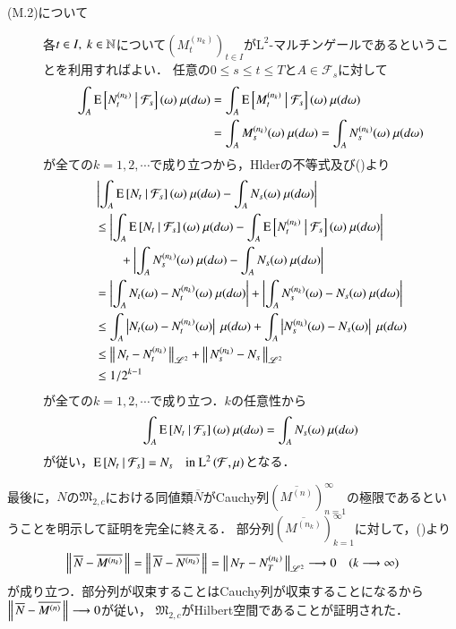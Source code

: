 \begin{prf}
\begin{description}
			\item[(M.2)について]
				各$t \in I,\ k \in \mathbb{N}$について$(M^{(n_k)}_t)_{t \in I}$が$\mathrm{L}^2$-マルチンゲールであるということを利用すればよい．
				任意の$0 \leq s \leq t \leq T$と$A \in \mathcal{F}_s$に対して
				\begin{align}
					\int_{A} \cexp{N^{(n_k)}_t}{\mathcal{F}_s}(\omega)\ \mu(d\omega) &= \int_{A} \cexp{M^{(n_k)}_t}{\mathcal{F}_s}(\omega)\ \mu(d\omega) \\
					&= \int_{A} M^{(n_k)}_s(\omega)\ \mu(d\omega) = \int_{A} N^{(n_k)}_s(\omega)\ \mu(d\omega)
				\end{align}
				が全ての$k = 1,2,\cdots$で成り立つから，Hlderの不等式及び()より
				\begin{align}
					&\left| \int_{A} \cexp{N_t}{\mathcal{F}_s}(\omega)\ \mu(d\omega) - \int_{A} N_s(\omega)\ \mu(d\omega) \right| \\
					&\leq \left| \int_{A} \cexp{N_t}{\mathcal{F}_s}(\omega)\ \mu(d\omega) - \int_{A} \cexp{N^{(n_k)}_t}{\mathcal{F}_s}(\omega)\ \mu(d\omega) \right| \\
						&\qquad+ \left| \int_{A} N^{(n_k)}_s(\omega)\ \mu(d\omega) - \int_{A} N_s(\omega)\ \mu(d\omega) \right| \\
					&= \left| \int_{A} N_t(\omega) - N^{(n_k)}_t(\omega)\ \mu(d\omega) \right|
						+ \left| \int_{A} N^{(n_k)}_s(\omega) - N_s(\omega)\ \mu(d\omega) \right| \\
					&\leq \int_{A} \left| N_t(\omega) - N^{(n_k)}_t(\omega) \right|\ \mu(d\omega)
						+ \int_{A} \left| N^{(n_k)}_s(\omega) - N_s(\omega) \right|\ \mu(d\omega) \\
					&\leq \Norm{N_t - N^{(n_k)}_t}{\mathscr{L}^2} + \Norm{N^{(n_k)}_s - N_s}{\mathscr{L}^2} \\
					&\leq 1/2^{k-1}
				\end{align}
				が全ての$k = 1,2,\cdots$で成り立つ．$k$の任意性から
				\begin{align}
					\int_{A} \cexp{N_t}{\mathcal{F}_s}(\omega)\ \mu(d\omega)
					= \int_{A} N_s(\omega)\ \mu(d\omega)
				\end{align}
				が従い，$\operatorname{E} \left[ N_t \ \middle|\ \mathcal{F}_s \right] = N_s \quad \mbox{in $\operatorname{L}^{2} \left(\mathcal{F},\mu\right)$}$となる．
		\end{description}
	
		最後に，$N$の$\mathfrak{M}_{2,c}$における同値類$\overline{N}$がCauchy列$\left(\overline{M^{(n)}}\right)_{n=1}^{\infty}$の極限であるということを明示して証明を完全に終える．
		部分列$\left(\overline{M^{(n_k)}}\right)_{k=1}^{\infty}$に対して，()より
		\begin{align}
				\left\|\, \overline{N} - \overline{M^{(n_k)}}\, \right\|_{} 
				= \left\|\, \overline{N} - \overline{N^{(n_k)}}\, \right\|_{}
				= \left\|\, N_T - N^{(n_k)}_T\, \right\|_{\mathscr{L}^2} \longrightarrow 0 \quad (k \longrightarrow \infty)
		\end{align}
		が成り立つ．部分列が収束することはCauchy列が収束することになるから$\left\|\, \overline{N} - \overline{M^{(n)}}\, \right\|_{} \longrightarrow 0$が従い，
		$\mathfrak{M}_{2,c}$がHilbert空間であることが証明された．
		\QED
	\end{prf}
	
